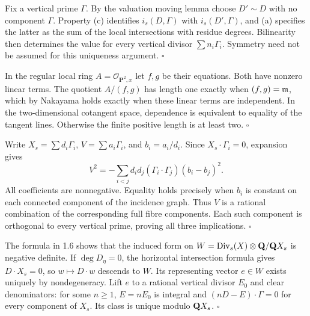 \documentclass[11pt]{article}
\let\chapterexercise\exercise
\renewcommand{\exercise}[2]{\Needspace{8\baselineskip}\chapterexercise{#1}{#2}}
\begin{document}
\pf Fix a vertical prime $\Gamma$. By the valuation moving lemma choose $D'\sim D$ with no component $\Gamma$. Property (c) identifies $i_s(D,\Gamma)$ with $i_s(D',\Gamma)$, and (a) specifies the latter as the sum of the local intersections with residue degrees. Bilinearity then determines the value for every vertical divisor $\sum n_i\Gamma_i$. Symmetry need not be assumed for this uniqueness argument. \hfill$\square$

\pf In the regular local ring $A=\mathcal O_{\mathbf P^2,x}$ let $f,g$ be their equations. Both have nonzero linear terms. The quotient $A/(f,g)$ has length one exactly when $(f,g)=\mathfrak m$, which by Nakayama holds exactly when these linear terms are independent. In the two-dimensional cotangent space, dependence is equivalent to equality of the tangent lines. Otherwise the finite positive length is at least two. \hfill$\square$

\pf Write $X_s=\sum d_i\Gamma_i$, $V=\sum a_i\Gamma_i$, and $b_i=a_i/d_i$. Since $X_s\cdot\Gamma_i=0$, expansion gives
\[ V^2=-\sum_{i<j}d_id_j(\Gamma_i\cdot\Gamma_j)(b_i-b_j)^2. \]
All coefficients are nonnegative. Equality holds precisely when $b_i$ is constant on each connected component of the incidence graph. Thus $V$ is a rational combination of the corresponding full fibre components. Each such component is orthogonal to every vertical prime, proving all three implications. \hfill$\square$

\pf The formula in 1.6 shows that the induced form on $W=\operatorname{Div}_s(X)\otimes\mathbf Q/\mathbf Q X_s$ is negative definite. If $\deg D_\eta=0$, the horizontal intersection formula gives $D\cdot X_s=0$, so $w\mapsto D\cdot w$ descends to $W$. Its representing vector $e\in W$ exists uniquely by nondegeneracy. Lift $e$ to a rational vertical divisor $E_0$ and clear denominators: for some $n\ge1$, $E=nE_0$ is integral and $(nD-E)\cdot\Gamma=0$ for every component of $X_s$. Its class is unique modulo $\mathbf Q X_s$. \hfill$\square$
\end{document}
